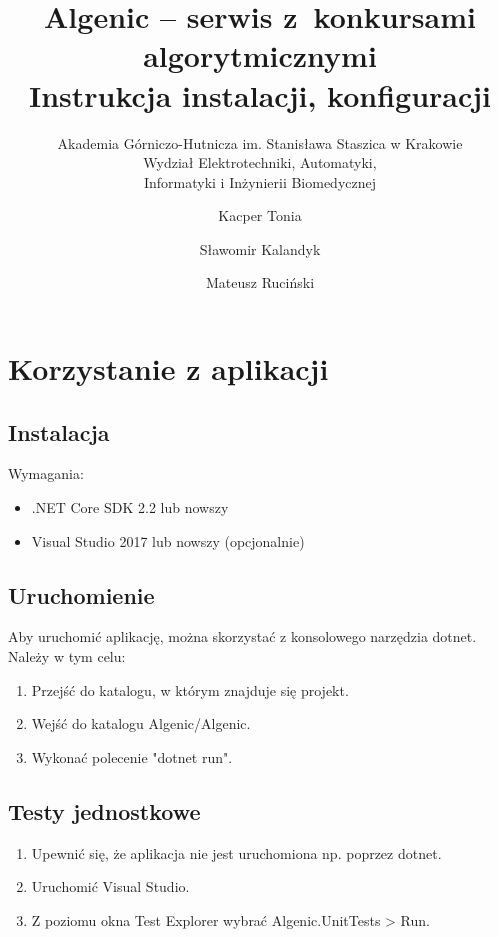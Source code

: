 \documentclass{article}
\title{Algenic -- serwis z~konkursami algorytmicznymi\\
Instrukcja instalacji, konfiguracji}
\subtitle{Akademia Górniczo-Hutnicza im. Stanisława Staszica w Krakowie\\
	Wydział Elektrotechniki, Automatyki,\\
	Informatyki i Inżynierii Biomedycznej}
\author{Kacper Tonia\and
		Sławomir Kalandyk\and
		Mateusz Ruciński}
\date{}
\begin{document}
\maketitle

\section{Korzystanie z aplikacji}
\subsection{Instalacja}
Wymagania:
\begin{itemize}
    \item .NET Core SDK 2.2 lub nowszy
    \item Visual Studio 2017 lub nowszy (opcjonalnie)
\end{itemize}

\subsection{Uruchomienie}
Aby uruchomić aplikację, można skorzystać z konsolowego narzędzia dotnet. Należy w tym celu:
\begin{enumerate}
    \item Przejść do katalogu, w którym znajduje się projekt.
    \item Wejść do katalogu Algenic/Algenic.
    \item Wykonać polecenie "dotnet run".
\end{enumerate}

\subsection{Testy jednostkowe}
\begin{enumerate}
    \item Upewnić się, że aplikacja nie jest uruchomiona np. poprzez dotnet.
    \item Uruchomić Visual Studio.
    \item Z poziomu okna Test Explorer wybrać Algenic.UnitTests > Run.
\end{enumerate}
\end{document}
